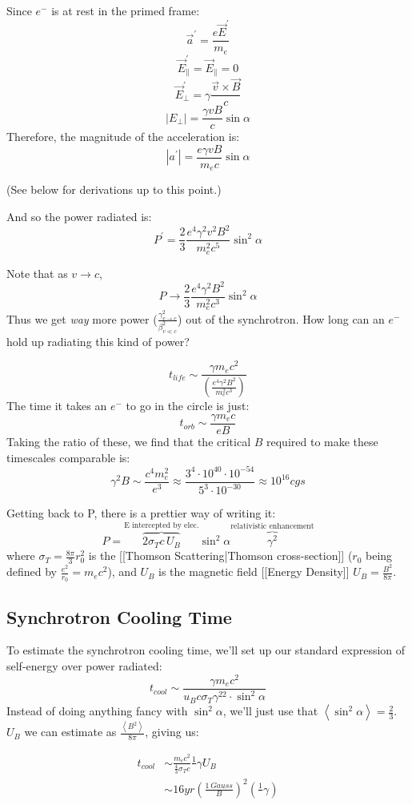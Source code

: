 \documentclass{article}
\def\inv#1{\frac1{#1}}
\def\ef{\vec E}
\def\inv#1{{\frac{1}{}#1}}
\def\mean#1{\left\langle {#1}\right\rangle}
\def\ef{\vec E}
\def\bfield{{\vec B}}
\def\e#1{\cdot10^{#1}}
\begin{document}
Since $e^-$ is at rest in the primed
frame:
$$\vec a^\prime=\frac{e\ef^\prime}{ m_e}$$
$$\ef_\|^\prime=\ef_\|=0$$
$$\ef_\perp^\prime=\gamma\frac{\vec v\times\bfield}{ c}$$
$$|E_\perp|=\frac{\gamma vB}{ c}\sin\alpha$$
Therefore, the magnitude of the acceleration is:
$$|a^\prime|=\frac{e\gamma vB}{ m_ec}\sin\alpha$$

(See below for derivations up to this point.)

And so the power radiated is:
$$\boxed{P^\prime=\frac{2}{3}\frac{e^4\gamma^2v^2B^2}{ m_e^2c^5}\sin^2\alpha}$$

Note that as $v\to c$,
$$P\to\frac{2}{3}\frac{e^4\gamma^2B^2}{ m_e^2c^3}\sin^2\alpha$$
Thus we get {\it way} more power ($\frac{\gamma_{v\to c}^2}{\beta_{v\ll c}^2}$) 
out of the synchrotron.  How long can an $e^-$ hold up radiating this kind
of power?

$$t_{life}\sim\frac{\gamma m_ec^2}{\left(\frac{e^4\gamma^2B^2}{ m_e^2c^3}\right)}$$
The time it takes an $e^-$ to go in the circle is just:
$$t_{orb}\sim\frac{\gamma m_ec}{ eB}$$
Taking the ratio of these, we find that the critical $B$ required to make
these timescales comparable is:
$$\gamma^2B\sim\frac{c^4m_e^2}{ e^3}\approx\frac{3^4\e{40}\e{-54}}{
5^3\e{-30}}\approx10^{16}cgs$$

Getting back to P, there is a prettier way of writing it:
$$P=\overbrace{2\sigma_Tc\,U_B}^\text{E  intercepted by elec.}
\sin^2\alpha\overbrace{\gamma^2}^\text{relativistic enhancement}$$
where $\sigma_T=\frac{8\pi}{3}r_0^2$ is the [[Thomson Scattering|Thomson cross-section]] ($r_0$ being
defined by $\frac{e^2}{ r_0}=m_ec^2$), and $U_B$ is the
magnetic field [[Energy Density]] $U_B=\frac{B^2}{8\pi}$.


\subsection{Synchrotron Cooling Time}

To estimate the synchrotron cooling time, we'll set up our standard expression
of self-energy over power radiated:
$$t_{cool}\sim\frac{\gamma m_ec^2}{ u_Bc\sigma_T\gamma^22\cdot\sin^2\alpha}$$
Instead of doing anything fancy with $\sin^2\alpha$, we'll just use that
$\mean{\sin^2\alpha}=\frac{2}{3}$.  $U_B$ we can estimate as $\frac{\mean{B^2}}{
8\pi}$, giving us:

$$\begin{aligned}t_{cool}&\sim\frac{m_ec^2}{\frac{4}{3}\sigma_Tc}\inv{\gamma U_B}\\ 
&\sim16yr\left(\frac{1\,Gauss}{ B}\right)^2\left(\inv{\gamma}\right)\\ \end{aligned}$$
\end{document}
